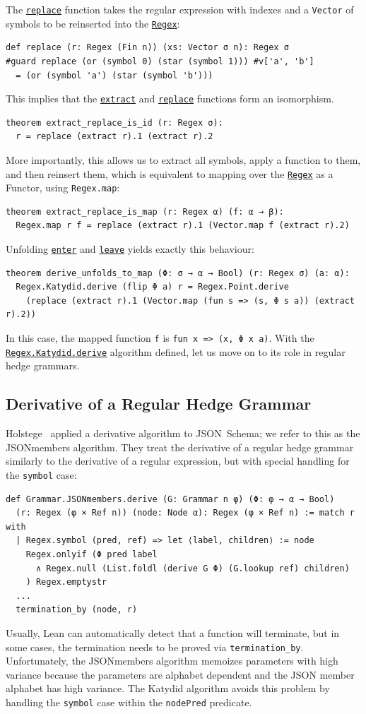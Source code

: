 \documentclass[runningheads]{llncs}
\newcommand{\link}[2]{\mbox{\hyperref[#2]{\lstinline{#1}}}\xspace}
\newcommand{\Regex}{\link{Regex}{Regex}}
\newcommand{\RegexKatydidDerive}{\link{Regex.Katydid.derive}{def Regex.Katydid.derive}}
\newcommand{\enter}{\link{enter}{def enter}}
\newcommand{\leave}{\link{leave}{def leave}}
\newcommand{\extract}{\link{extract}{def extract}}
\newcommand{\replace}{\link{replace}{def replace}}
\newcommand{\Lean}{%
  Lean\xspace%
}
\newcommand{\JSON}{\ac{JSON}\xspace}
\begin{document}
The \replace function takes the regular expression with indexes and a \lstinline{Vector} of symbols to be reinserted into the \Regex:
\begin{lstlisting}[label=def replace]
def replace (r: Regex (Fin n)) (xs: Vector σ n): Regex σ
#guard replace (or (symbol 0) (star (symbol 1))) #v['a', 'b']
  = (or (symbol 'a') (star (symbol 'b')))
\end{lstlisting}
This implies that the \extract and \replace functions form an isomorphism. 
\begin{lstlisting}[label=theorem extract_replace_is_id]
theorem extract_replace_is_id (r: Regex σ):
  r = replace (extract r).1 (extract r).2
\end{lstlisting}
More importantly, this allows us to extract all symbols, apply a function to them, and then reinsert them, which is equivalent to mapping over the \Regex as a Functor, using \lstinline{Regex.map}:
\begin{lstlisting}[label=theorem extract_replace_is_map]
theorem extract_replace_is_map (r: Regex α) (f: α → β):
  Regex.map r f = replace (extract r).1 (Vector.map f (extract r).2)
\end{lstlisting}
Unfolding \enter and \leave yields exactly this behaviour:
\begin{lstlisting}
theorem derive_unfolds_to_map (Φ: σ → α → Bool) (r: Regex σ) (a: α):
  Regex.Katydid.derive (flip Φ a) r = Regex.Point.derive
    (replace (extract r).1 (Vector.map (fun s => (s, Φ s a)) (extract r).2))
\end{lstlisting}
In this case, the mapped function \lstinline{f} is \lstinline{fun x => (x, Φ x a)}.
With the \RegexKatydidDerive algorithm defined, let us move on to its role in regular hedge grammars.

\subsection{Derivative of a Regular Hedge Grammar}

Holstege~\cite{holstege2019application} applied a derivative algorithm to JSON~Schema; we refer to this as the JSONmembers algorithm.
They treat the derivative of a regular hedge grammar similarly to the derivative of a regular expression, but with special handling for the \lstinline{symbol} case:
\begin{lstlisting}[label=def Grammar.JSONmembers.derive]
def Grammar.JSONmembers.derive (G: Grammar n φ) (Φ: φ → α → Bool)
  (r: Regex (φ × Ref n)) (node: Node α): Regex (φ × Ref n) := match r with
  | Regex.symbol (pred, ref) => let ⟨label, children⟩ := node
    Regex.onlyif (Φ pred label
      ∧ Regex.null (List.foldl (derive G Φ) (G.lookup ref) children)
    ) Regex.emptystr
  ...
  termination_by (node, r)
\end{lstlisting}
Usually, \Lean can automatically detect that a function will terminate, but in some cases, the termination needs to be proved via \lstinline{termination_by}.
Unfortunately, the JSONmembers algorithm memoizes parameters with high variance because the parameters are alphabet dependent and the \JSON member alphabet has high variance.
The Katydid algorithm avoids this problem by handling the \lstinline{symbol} case within the \lstinline{nodePred} predicate.
\end{document}
